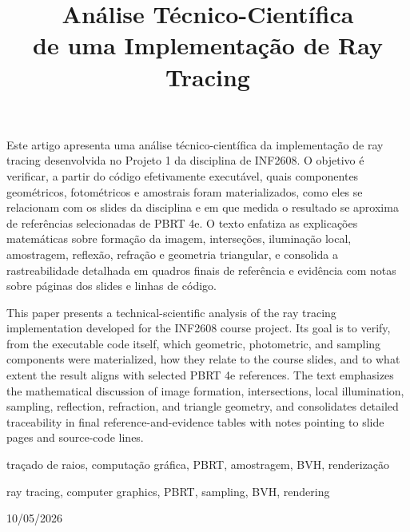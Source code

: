 \documentclass[portuguese]{sbcreviews-2025}%
\title[Análise Técnico-Científica de Ray Tracing]{Análise Técnico-Científica\\de uma Implementação de Ray Tracing}
\author[Yang Ricardo Barcellos Miranda]{
\affil{\textbf{Yang Ricardo Barcellos Miranda}~[\href{mailto:ymiranda@inf.puc-rio.br}{\nolinkurl{ymiranda@inf.puc-rio.br}}]}
}
\begin{document}
\begin{frontmatter}

\maketitle

\begin{abstract-pt}
Este artigo apresenta uma análise técnico-científica da implementação de ray tracing desenvolvida no Projeto 1 da disciplina de INF2608. O objetivo é verificar, a partir do código efetivamente executável, quais componentes geométricos, fotométricos e amostrais foram materializados, como eles se relacionam com os slides da disciplina e em que medida o resultado se aproxima de referências selecionadas de PBRT 4e. O texto enfatiza as explicações matemáticas sobre formação da imagem, interseções, iluminação local, amostragem, reflexão, refração e geometria triangular, e consolida a rastreabilidade detalhada em quadros finais de referência e evidência com notas sobre páginas dos slides e linhas de código.
\end{abstract-pt}

\begin{abstract-en}
This paper presents a technical-scientific analysis of the ray tracing implementation developed for the INF2608 course project. Its goal is to verify, from the executable code itself, which geometric, photometric, and sampling components were materialized, how they relate to the course slides, and to what extent the result aligns with selected PBRT 4e references. The text emphasizes the mathematical discussion of image formation, intersections, local illumination, sampling, reflection, refraction, and triangle geometry, and consolidates detailed traceability in final reference-and-evidence tables with notes pointing to slide pages and source-code lines.
\end{abstract-en}

\begin{pchaves}
traçado de raios, computação gráfica, PBRT, amostragem, BVH, renderização
\end{pchaves}

\begin{keywords}
ray tracing, computer graphics, PBRT, sampling, BVH, rendering
\end{keywords}

\begin{dates}
 10/05/2026
\end{dates}

\end{frontmatter}
\end{document}
